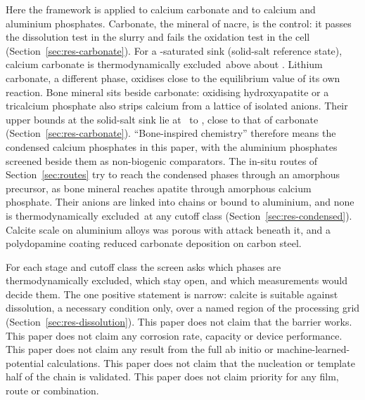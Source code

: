 Here the framework is applied to calcium carbonate and to calcium and aluminium phosphates. %
Carbonate, the mineral of nacre, is the control: it passes the dissolution test in the slurry and fails the oxidation test in the cell (Section~\ref{sec:res-carbonate}). %
For a -saturated sink (solid-salt reference state), calcium carbonate is thermodynamically excluded\nacreExcludedMark\ above about \NumCarbonateCrossover. %
Lithium carbonate, a different phase, oxidises close to the equilibrium value of its own reaction\cite{mahne2018electrochemical,cao2022oxidative}. %
Bone mineral sits beside carbonate: oxidising hydroxyapatite or a tricalcium phosphate also strips calcium from a lattice of isolated anions. %
Their upper bounds at the solid-salt sink lie at \NumOnsetBoneLow\ to \NumOnsetBoneHigh, close to that of carbonate (Section~\ref{sec:res-carbonate}). %
``Bone-inspired chemistry'' therefore means the condensed calcium phosphates in this paper, with the aluminium phosphates screened beside them as non-biogenic comparators. %
The in-situ routes of Section~\ref{sec:routes} try to reach the condensed phases through an amorphous precursor, as bone mineral reaches apatite through amorphous calcium phosphate. %
Their anions are linked into chains or bound to aluminium, and none is thermodynamically excluded\nacreExcludedMark\ at any cutoff class (Section~\ref{sec:res-condensed}). %
Calcite scale on aluminium alloys was porous with attack beneath it\cite{osoriocelestino2020influence}, and a polydopamine coating reduced carbonate deposition on carbon steel\cite{yu2023study}. %

For each stage and cutoff class the screen asks which phases are thermodynamically excluded\nacreExcludedMark, which stay open, and which measurements would decide them. %
The one positive statement is narrow: calcite is suitable against dissolution, a necessary condition only, over a named region of the processing grid (Section~\ref{sec:res-dissolution}). %
This paper does not claim that the barrier works.
This paper does not claim any corrosion rate, capacity or device performance.
This paper does not claim any result from the full ab initio or machine-learned-potential calculations.
This paper does not claim that the nucleation or template half of the chain is validated.
This paper does not claim priority for any film, route or combination.
